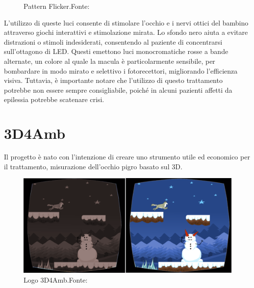 \documentclass[
a4paper,
cleardoublepage=empty,
headings=twolinechapter,
numbers=autoenddot,
]{scrbook}
\begin{document}
\begin{itemize}
\begin{figure}[H]
			\caption{Pattern Flicker.Fonte:\cite{Pattern-Flicker}}
			\label{fig:Pattern-Flicker}
		\end{figure}
		L'utilizzo di queste luci consente di stimolare l'occhio e i nervi ottici del bambino attraverso giochi interattivi e stimolazione mirata. Lo sfondo nero aiuta a evitare distrazioni o stimoli indesiderati, consentendo al paziente di concentrarsi sull'ottagono di LED. Questi emettono luci monocromatiche rosse a bande alternate, un colore al quale la macula è particolarmente sensibile, per bombardare in modo mirato e selettivo i fotorecettori, migliorando l'efficienza visiva. Tuttavia, è importante notare che l'utilizzo di questo trattamento potrebbe non essere sempre consigliabile, poiché in alcuni pazienti affetti da epilessia potrebbe scatenare crisi.
	\end{itemize}
	
	\chapter{3D4Amb}
	Il progetto è nato con l'intenzione di creare uno strumento utile ed economico per il trattamento, misurazione dell'occhio pigro basato sul 3D.
	\begin{figure}[h]
		\centering
		\includegraphics[width=0.8\linewidth]{image/3D4Amb}
		\caption{Logo 3D4Amb.Fonte:\cite{3d4amb}}
		\label{fig:3D4Amb}
	\end{figure}
\end{document}
